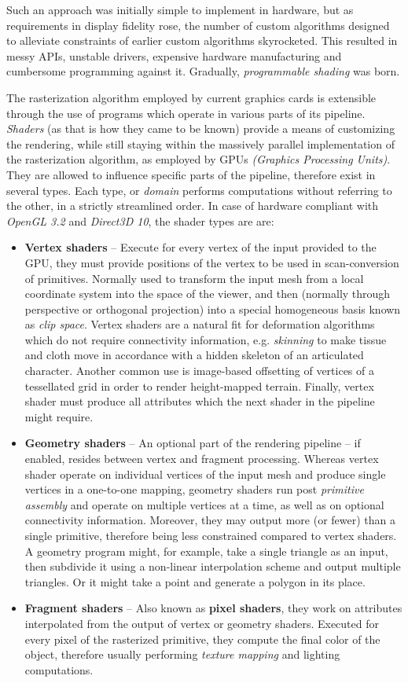 Such an approach was initially simple to implement in hardware, but as requirements in display fidelity rose, the number of custom algorithms designed to alleviate constraints of earlier custom algorithms skyrocketed. This resulted in messy APIs, unstable drivers, expensive hardware manufacturing and cumbersome programming against it. Gradually, \emph{programmable shading} was born.

The rasterization algorithm employed by current graphics cards is extensible through the use of programs which operate in various parts of its pipeline. \emph{Shaders} (as that is how they came to be known) provide a means of customizing the rendering, while still staying within the massively parallel implementation of the rasterization algorithm, as employed by GPUs \emph{(Graphics Processing Units)}. They are allowed to influence specific parts of the pipeline, therefore exist in several types. Each type, or \emph{domain} performs computations without referring to the other, in a strictly streamlined order. In case of hardware compliant with \emph{OpenGL 3.2} and \emph{Direct3D 10}, the shader types are are:
\begin{itemize}
\item \textbf{Vertex shaders} -- Execute for every vertex of the input provided to the GPU, they must provide positions of the vertex to be used in scan-conversion of primitives. Normally used to transform the input mesh from a local coordinate system into the space of the viewer, and then (normally through perspective or orthogonal projection) into a special homogeneous basis known as \emph{clip space}. Vertex shaders are a natural fit for deformation algorithms which do not require connectivity information, e.g. \emph{skinning} to make tissue and cloth move in accordance with a hidden skeleton of an articulated character. Another common use is image-based offsetting of vertices of a tessellated grid in order to render height-mapped terrain. Finally, vertex shader must produce all attributes which the next shader in the pipeline might require.
\item \textbf{Geometry shaders} -- An optional part of the rendering pipeline -- if enabled, resides between vertex and fragment processing. Whereas vertex shader operate on individual vertices of the input mesh and produce single vertices in a one-to-one mapping, geometry shaders run post \emph{primitive assembly} and operate on multiple vertices at a time, as well as on optional connectivity information. Moreover, they may output more (or fewer) than a single primitive, therefore being less constrained compared to vertex shaders. A geometry program might, for example, take a single triangle as an input, then subdivide it using a non-linear interpolation scheme and output multiple triangles. Or it might take a point and generate a polygon in its place.
\item \textbf{Fragment shaders} -- Also known as \textbf{pixel shaders}, they work on attributes interpolated from the output of vertex or geometry shaders. Executed for every pixel of the rasterized primitive, they compute the final color of the object, therefore usually performing \emph{texture mapping} and lighting computations.
\end{itemize}

